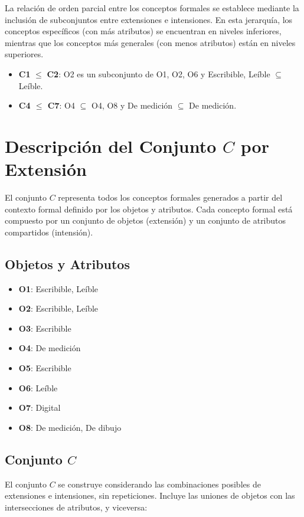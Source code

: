 La relación de orden parcial entre los conceptos formales se establece mediante la inclusión de subconjuntos entre extensiones e intensiones. En esta jerarquía, los conceptos específicos (con más atributos) se encuentran en niveles inferiores, mientras que los conceptos más generales (con menos atributos) están en niveles superiores.

\begin{itemize}
    \item \textbf{C1} $\leq$ \textbf{C2}: {O2} es un subconjunto de {O1, O2, O6} y {Escribible, Leíble} $\subseteq$ {Leíble}.
    \item \textbf{C4 $\leq$ C7}: {O4} $\subseteq$ {O4, O8} y {De medición} $\subseteq$ {De medición}.
  \end{itemize}
  

\section{Descripción del Conjunto \( C \) por Extensión}

  El conjunto \( C \) representa todos los conceptos formales generados a partir del contexto formal definido por los objetos y atributos. Cada concepto formal está compuesto por un conjunto de objetos (extensión) y un conjunto de atributos compartidos (intensión).
  
  \subsection{Objetos y Atributos}
  \begin{itemize}
      \item \textbf{O1}: Escribible, Leíble
      \item \textbf{O2}: Escribible, Leíble
      \item \textbf{O3}: Escribible
      \item \textbf{O4}: De medición
      \item \textbf{O5}: Escribible
      \item \textbf{O6}: Leíble
      \item \textbf{O7}: Digital
      \item \textbf{O8}: De medición, De dibujo
  \end{itemize}
  
  \subsection{Conjunto \( C \)}
  El conjunto \( C \) se construye considerando las combinaciones posibles de extensiones e intensiones, sin repeticiones. Incluye las uniones de objetos con las intersecciones de atributos, y viceversa:
  
